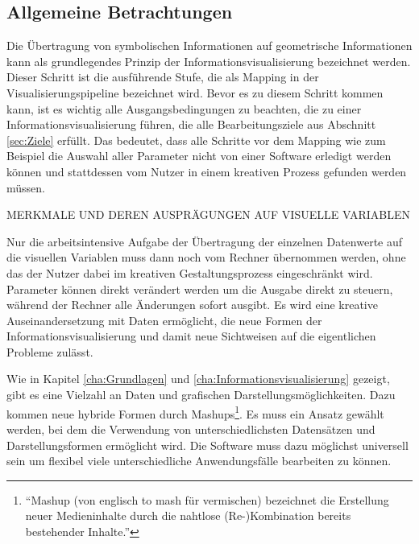 \documentclass[a4paper, 12pt, DIVcalc, onepage, pdftex, headsepline, footsepline]{scrreprt}
\begin{document}
\subsection{Allgemeine Betrachtungen}
Die Übertragung von symbolischen Informationen auf geometrische Informationen kann als grundlegendes Prinzip der
Informationsvisualisierung bezeichnet werden. Dieser Schritt ist die ausführende Stufe, die als Mapping in der
Visualisierungspipeline bezeichnet wird. Bevor es zu diesem Schritt kommen kann, ist es wichtig
alle Ausgangsbedingungen zu beachten, die zu einer Informationsvisualisierung führen, die alle Bearbeitungsziele aus
Abschnitt \ref{sec:Ziele} erfüllt. Das bedeutet, dass alle Schritte vor dem Mapping wie zum Beispiel die Auswahl
aller Parameter nicht von einer Software erledigt werden können und stattdessen vom Nutzer in einem kreativen
Prozess gefunden werden müssen.

MERKMALE UND DEREN AUSPRÄGUNGEN AUF VISUELLE VARIABLEN

Nur die arbeitsintensive Aufgabe der Übertragung der einzelnen Datenwerte auf die visuellen Variablen muss
dann noch vom Rechner übernommen werden, ohne das der Nutzer dabei im kreativen Gestaltungsprozess eingeschränkt
wird. Parameter können direkt verändert werden um die Ausgabe direkt zu steuern, während der
Rechner alle Änderungen sofort ausgibt. Es wird eine kreative Auseinandersetzung
mit Daten ermöglicht, die neue Formen der Informationsvisualisierung und damit neue Sichtweisen auf
die eigentlichen Probleme zulässt.

Wie in Kapitel \ref{cha:Grundlagen} und \ref{cha:Informationsvisualisierung} gezeigt, gibt es eine Vielzahl an
Daten und grafischen Darstellungsmöglichkeiten. Dazu kommen neue hybride Formen durch Mashups\footnote{"`Mashup (von
englisch to mash für vermischen) bezeichnet die Erstellung neuer Medieninhalte durch die nahtlose
(Re-)Kombination bereits bestehender Inhalte."'\citep{wiki_mashup}}. Es muss ein Ansatz gewählt
werden, bei dem die Verwendung von unterschiedlichsten Datensätzen und Darstellungsformen ermöglicht wird.
Die Software muss dazu möglichst universell sein um flexibel viele unterschiedliche Anwendungsfälle
bearbeiten zu können.
\end{document}
